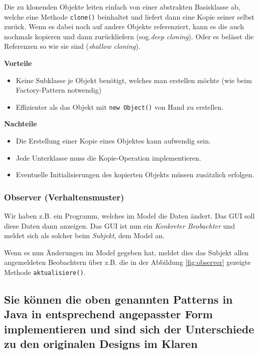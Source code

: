 
Die zu klonenden Objekte leiten einfach von einer abstrakten Basisklasse ab, welche eine Methode \texttt{clone()} beinhaltet und liefert dann eine Kopie seiner selbst zurück. Wenn es dabei noch auf andere Objekte referenziert, kann es die auch nochmals kopieren und dann zurückliefern (sog.\emph{deep cloning}). Oder es belässt die Referenzen so wie sie sind (\emph{shallow cloning}).

\textbf{Vorteile}
\begin{itemize}
  \item Keine Subklasse je Objekt benötigt, welches man erstellen möchte (wie beim Factory-Pattern notwendig)
  \item Effizienter als das Objekt mit \texttt{new Object()} von Hand zu erstellen.
\end{itemize}

\textbf{Nachteile}
\begin{itemize}
  \item Die Erstellung einer Kopie eines Objektes kann aufwendig sein.
  \item Jede Unterklasse muss die Kopie-Operation implementieren. 
  \item Eventuelle Initialisierungen des kopierten Objekts müssen zusätzlich erfolgen.
\end{itemize}


\subsubsection{Observer (Verhaltensmuster)}

Wir haben z.B. ein Programm, welches im Model die Daten ändert. Das GUI soll diese Daten dann anzeigen. Das GUI ist nun ein \emph{Konkreter Beobachter} und meldet sich als solcher beim \emph{Subjekt}, dem Model an.

Wenn es nun Änderungen im Model gegeben hat, meldet dies das Subjekt allen angemeldeten Beobachtern über z.B. die in der Abbildung \ref{fig:observer} gezeigte Methode \texttt{aktualisiere()}.


\subsection{Sie können die oben genannten Patterns in Java in entsprechend angepasster Form implementieren und sind sich der Unterschiede zu den originalen Designs im Klaren}

